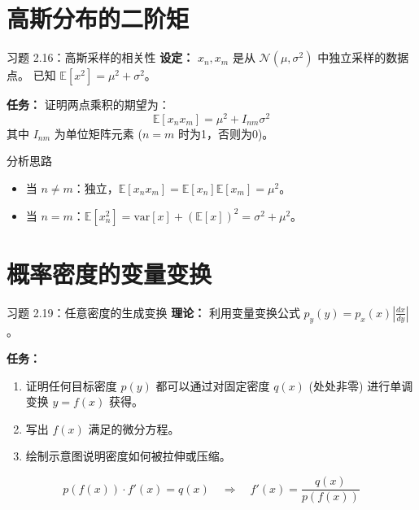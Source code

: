 \documentclass[12pt, aspectratio=169]{beamer}
\begin{document}
\section{高斯分布的二阶矩}
\begin{frame}{习题 2.16：高斯采样的相关性}
    \textbf{设定：}
    $x_n, x_m$ 是从 $\mathcal{N}(\mu, \sigma^2)$ 中独立采样的数据点。
    已知 $\mathbb{E}[x^2]=\mu^2+\sigma^2$。
    
    \textbf{任务：}
    证明两点乘积的期望为：
    \begin{equation}
        \mathbb{E}\left[x_{n} x_{m}\right]=\mu^{2}+I_{n m} \sigma^{2}
    \end{equation}
    其中 $I_{nm}$ 为单位矩阵元素 ($n=m$ 时为1，否则为0)。
    
    \begin{block}{分析思路}
        \begin{itemize}
            \item 当 $n \neq m$：独立，$\mathbb{E}[x_n x_m] = \mathbb{E}[x_n]\mathbb{E}[x_m] = \mu^2$。
            \item 当 $n = m$：$\mathbb{E}[x_n^2] = \text{var}[x] + (\mathbb{E}[x])^2 = \sigma^2 + \mu^2$。
        \end{itemize}
    \end{block}
\end{frame}

\section{概率密度的变量变换}
\begin{frame}{习题 2.19：任意密度的生成变换}
    \textbf{理论：}
    利用变量变换公式 $p_y(y) = p_x(x) \left| \frac{dx}{dy} \right|$。
    
    \textbf{任务：}
    \begin{enumerate}
        \item 证明任何目标密度 $p(y)$ 都可以通过对固定密度 $q(x)$ (处处非零) 进行单调变换 $y=f(x)$ 获得。
        \item 写出 $f(x)$ 满足的微分方程。
        \item 绘制示意图说明密度如何被拉伸或压缩。
    \end{enumerate}
    
    \begin{equation}
        p(f(x)) \cdot f'(x) = q(x) \quad \Rightarrow \quad f'(x) = \frac{q(x)}{p(f(x))}
    \end{equation}
\end{frame}
\end{document}
